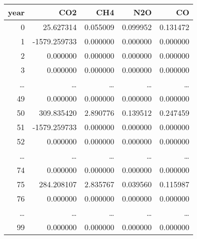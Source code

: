\documentclass[logo, color, author]{article}
\begin{document}
\begin{center}
\begin{tabular}{rrrrr}
\hline
year & CO2 & CH4 & N2O & CO\\
\hline
0 & 25.627314 & 0.055009 & 0.099952 & 0.131472\\
1 & -1579.259733 & 0.000000 & 0.000000 & 0.000000\\
2 & 0.000000 & 0.000000 & 0.000000 & 0.000000\\
3 & 0.000000 & 0.000000 & 0.000000 & 0.000000\\
\ldots{} & \ldots{} & \ldots{} & \ldots{} & \ldots{}\\
49 & 0.000000 & 0.000000 & 0.000000 & 0.000000\\
50 & 309.835420 & 2.890776 & 0.139512 & 0.247459\\
51 & -1579.259733 & 0.000000 & 0.000000 & 0.000000\\
52 & 0.000000 & 0.000000 & 0.000000 & 0.000000\\
\ldots{} & \ldots{} & \ldots{} & \ldots{} & \ldots{}\\
74 & 0.000000 & 0.000000 & 0.000000 & 0.000000\\
75 & 284.208107 & 2.835767 & 0.039560 & 0.115987\\
76 & 0.000000 & 0.000000 & 0.000000 & 0.000000\\
\ldots{} & \ldots{} & \ldots{} & \ldots{} & \ldots{}\\
99 & 0.000000 & 0.000000 & 0.000000 & 0.000000\\
\hline
\end{tabular}
\end{center}
\end{document}
